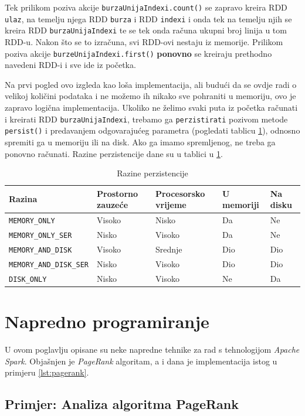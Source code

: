 \documentclass[times, utf8, zavrsni]{fer}
\begin{document}
Tek prilikom poziva akcije \texttt{burzaUnijaIndexi.count()} se zapravo kreira RDD \texttt{ulaz}, na temelju njega RDD \texttt{burza} i RDD \texttt{indexi} i onda tek na temelju njih se kreira RDD \texttt{burzaUnijaIndexi} te se tek onda računa ukupni broj linija u tom RDD-u. Nakon što se to izračuna, svi RDD-ovi nestaju iz memorije.  Prilikom poziva akcije \texttt{burzeUnijaIndexi.first()} \textbf{ponovno} se kreiraju prethodno navedeni RDD-i i sve ide iz početka.

Na prvi pogled ovo izgleda kao loša implementacija, ali budući da se ovdje radi o velikoj količini podataka i ne možemo ih nikako sve pohraniti u memoriju, ovo je zapravo logična implementacija. Ukoliko ne želimo svaki puta iz početka računati i kreirati RDD \texttt{burzaUnijaIndexi}, trebamo ga \texttt{perzistirati} pozivom metode \texttt{persist()} i predavanjem odgovarajućeg parametra (pogledati tablicu \ref{tbl:razinePerzistencije}), odnosno spremiti ga u memoriju ili na disk. Ako ga imamo spremljenog, ne treba ga ponovno računati. Razine perzistencije dane su u tablici u \ref{tbl:razinePerzistencije}.  

\begin{table}[htb]
\scriptsize
\caption{Razine perzistencije}
\label{tbl:razinePerzistencije}
\centering
\begin{tabular}{lllll} 
\hline
Razina & Prostorno zauzeće & Procesorsko vrijeme & U memoriji & Na disku\\
\hline
\texttt{MEMORY\_ONLY} & Visoko & Nisko & Da & Ne  \\
\texttt{MEMORY\_ONLY\_SER} & Nisko & Visoko & Da & Ne  \\
\texttt{MEMORY\_AND\_DISK} & Visoko & Srednje & Dio & Dio \\
\texttt{MEMORY\_AND\_DISK\_SER} & Nisko & Visoko & Dio & Dio \\
\texttt{DISK\_ONLY} & Nisko & Visoko & Ne & Da \\
\hline
\end{tabular}
\end{table}


\chapter{Napredno programiranje}
U ovom poglavlju opisane su neke napredne tehnike za rad s tehnologijom \emph{Apache Spark}. Objašnjen je \emph{PageRank} algoritam, a i dana je implementacija istog u primjeru \ref{lst:pagerank}.
\section{Primjer: Analiza algoritma PageRank}
\end{document}
